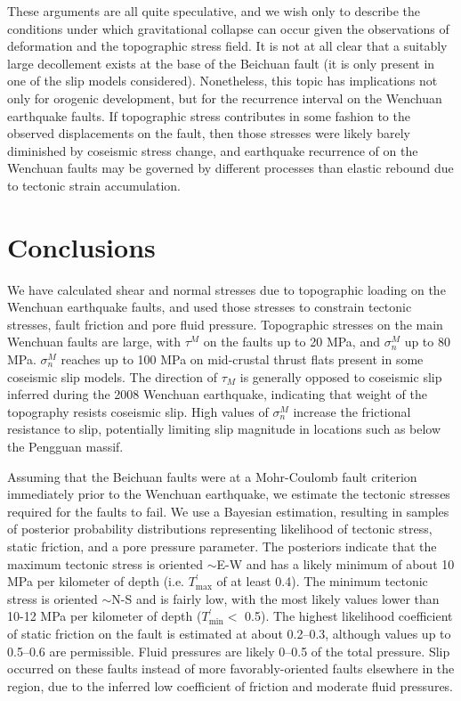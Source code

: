 \documentclass[draft,jgrga]{AGUTeX}
\begin{document}
\begin{article}
These arguments are all quite speculative, and we wish only to describe the
conditions under which gravitational collapse can occur given the
observations of deformation and the topographic stress field. It is not
at all clear that a suitably large decollement exists at the base of the
Beichuan fault (it is only present in one of the slip models
considered). Nonetheless, this topic has implications not only for
orogenic development, but for the recurrence interval on the Wenchuan
earthquake faults. If topographic stress contributes in some fashion to
the observed displacements on the fault, then those stresses were likely
barely diminished by coseismic stress change, and earthquake recurrence
of on the Wenchuan faults may be governed by different processes than
elastic rebound due to tectonic strain accumulation.

\section{Conclusions}\label{conclusions}

We have calculated shear and normal stresses due to topographic loading
on the Wenchuan earthquake faults, and used those stresses to constrain
tectonic stresses, fault friction and pore fluid pressure. Topographic
stresses on the main Wenchuan faults are large, with $\tau^M$ on the
faults up to \textbar{}20\textbar{} MPa, and $\sigma^M_n$ up to 80 MPa.
$\sigma^M_n$ reaches up to 100 MPa on mid-crustal thrust flats present
in some coseismic slip models. The direction of $\tau_M$ is generally
opposed to coseismic slip inferred during the 2008 Wenchuan earthquake,
indicating that weight of the topography resists coseismic slip. High
values of $\sigma^M_n$ increase the frictional resistance to slip,
potentially limiting slip magnitude in locations such as below the
Pengguan massif.

Assuming that the Beichuan faults were at a Mohr-Coulomb fault
criterion immediately prior to the Wenchuan earthquake, we estimate
the tectonic stresses required for the faults to fail. We use a
Bayesian estimation, resulting in samples of posterior probability
distributions representing likelihood of tectonic stress, static
friction, and a pore pressure parameter. The posteriors indicate that
the maximum tectonic stress is oriented $\sim$E-W and has a likely
minimum of about 10 MPa per kilometer of depth
(i.e. $T^\prime_{\mathrm{max}}$ of at least 0.4).  The minimum
tectonic stress is oriented $\sim$N-S and is fairly low, with the most
likely values lower than 10-12 MPa per kilometer of depth
($T^\prime_{\mathrm{min}} <$ 0.5).  The highest likelihood coefficient
of static friction on the fault is estimated at about 0.2--0.3,
although values up to 0.5--0.6 are permissible. Fluid pressures are
likely 0--0.5 of the total pressure.  Slip occurred on these faults
instead of more favorably-oriented faults elsewhere in the region, due
to the inferred low coefficient of friction and moderate fluid
pressures.


\end{article}
\end{document}
